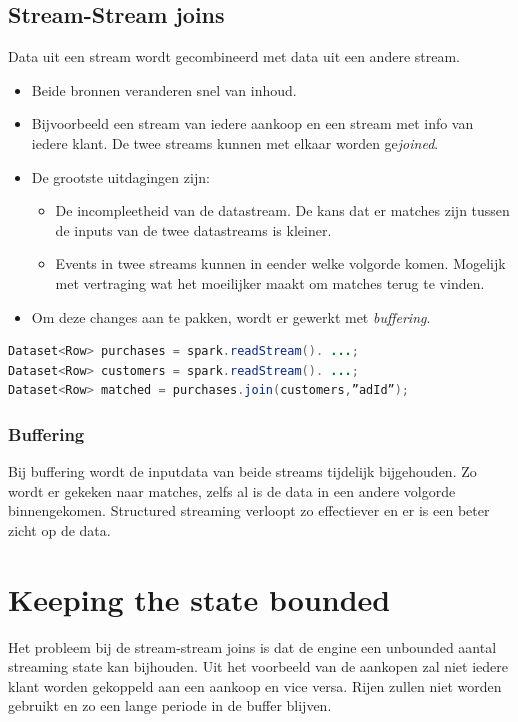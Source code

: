\documentclass[a4paper,10pt,twoside]{report}
\begin{document}
\subsection{Stream-Stream joins}

Data uit een stream wordt gecombineerd met data uit een andere stream. 

\begin{itemize}
	\item Beide bronnen veranderen snel van inhoud. 
	\item Bijvoorbeeld een stream van iedere aankoop en een stream met info van iedere klant. De twee streams kunnen met elkaar worden ge\textit{joined}.
	\item De grootste uitdagingen zijn:
	\begin{itemize}
		\item De incompleetheid van de datastream. De kans dat er matches zijn tussen de inputs van de twee datastreams is kleiner. 
		\item Events in twee streams kunnen in eender welke volgorde komen. Mogelijk met vertraging wat het moeilijker maakt om matches terug te vinden.
	\end{itemize} 
	\item Om deze changes aan te pakken, wordt er gewerkt met \textit{buffering}. 
\end{itemize}

\begin{lstlisting}[language=Java]
Dataset<Row> purchases = spark.readStream(). ...;
Dataset<Row> customers = spark.readStream(). ...;
Dataset<Row> matched = purchases.join(customers,”adId”);
\end{lstlisting}

\subsubsection{Buffering}

Bij buffering wordt de inputdata van beide streams tijdelijk bijgehouden. Zo wordt er gekeken naar matches, zelfs al is de data in een andere volgorde binnengekomen. Structured streaming verloopt zo effectiever en er is een beter zicht op de data.

\section{Keeping the state bounded}

Het probleem bij de stream-stream joins is dat de engine een unbounded aantal streaming state kan bijhouden. Uit het voorbeeld van de aankopen zal niet iedere klant worden gekoppeld aan een aankoop en vice versa. Rijen zullen niet worden gebruikt en zo een lange periode in de buffer blijven.
\end{document}
